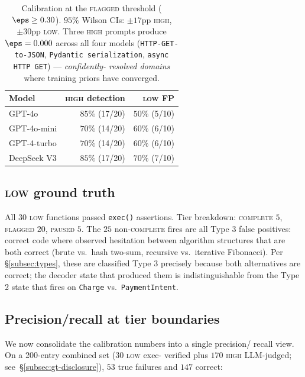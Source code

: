 \begin{table}[h]
\centering
\small
\begin{tabular}{lrr}
\toprule
Model & \textsc{high} detection & \textsc{low} FP \\
\midrule
GPT-4o         & $85\%$ (17/20) & $50\%$ (5/10) \\
GPT-4o-mini    & $70\%$ (14/20) & $60\%$ (6/10) \\
GPT-4-turbo    & $70\%$ (14/20) & $60\%$ (6/10) \\
DeepSeek V3    & $85\%$ (17/20) & $70\%$ (7/10) \\
\bottomrule
\end{tabular}
\caption{Calibration at the \textsc{flagged} threshold ($\eps \ge
0.30$). $95\%$ Wilson CIs: $\pm 17$pp \textsc{high}, $\pm 30$pp
\textsc{low}. Three \textsc{high} prompts produce $\eps = 0.000$
across all four models (\texttt{HTTP-GET-to-JSON}, \texttt{Pydantic
serialization}, \texttt{async HTTP GET}) --- \emph{confidently-%
resolved domains} where training priors have converged.}
\label{tab:calibration}
\end{table}

\subsection{\textsc{low} ground truth}
\label{subsec:low-gt}

All $30$ \textsc{low} functions passed \texttt{exec()} assertions.
Tier breakdown: \textsc{complete} $5$, \textsc{flagged} $20$,
\textsc{paused} $5$. The $25$ non-\textsc{complete} fires are all
Type 3 false positives: correct code where \eps observed hesitation
between algorithm structures that are both correct (brute vs.\ hash
two-sum, recursive vs.\ iterative Fibonacci). Per
\S\ref{subsec:types}, these are classified Type 3 precisely because
both alternatives are correct; the decoder state that produced them
is indistinguishable from the Type 2 state that fires on
\texttt{Charge} vs.\ \texttt{PaymentIntent}.

\subsection{Precision/recall at tier boundaries}
\label{subsec:pr}

We now consolidate the calibration numbers into a single precision/
recall view. On a 200-entry combined set ($30$ \textsc{low} exec-%
verified plus $170$ \textsc{high} LLM-judged;
see~\S\ref{subsec:gt-disclosure}), $53$ true failures and $147$
correct:

